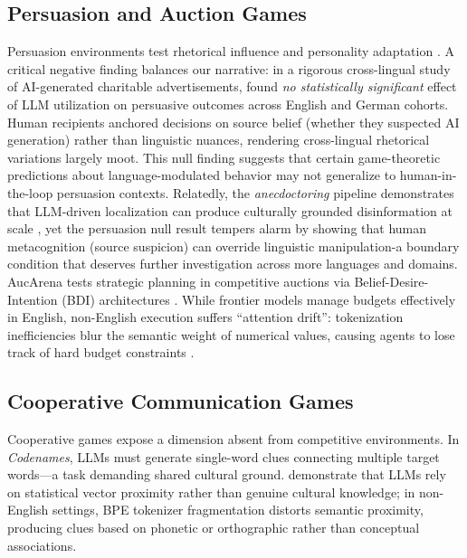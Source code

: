 \documentclass[11pt]{article}
\begin{document}
\subsection{Persuasion and Auction Games}
\label{sec:persuasion}

Persuasion environments test rhetorical influence and personality adaptation \citep{karande2024persuasion}. A critical negative finding balances our narrative: in a rigorous cross-lingual study of AI-generated charitable advertisements, \citet{arango2024persuasion} found \textit{no statistically significant} effect of LLM utilization on persuasive outcomes across English and German cohorts. Human recipients anchored decisions on source belief (whether they suspected AI generation) rather than linguistic nuances, rendering cross-lingual rhetorical variations largely moot. This null finding suggests that certain game-theoretic predictions about language-modulated behavior may not generalize to human-in-the-loop persuasion contexts. Relatedly, the \textit{anecdoctoring} pipeline demonstrates that LLM-driven localization can produce culturally grounded disinformation at scale \citep{lucas2025anecdoctoring}, yet the persuasion null result tempers alarm by showing that human metacognition (source suspicion) can override linguistic manipulation-a boundary condition that deserves further investigation across more languages and domains. AucArena tests strategic planning in competitive auctions via Belief-Desire-Intention (BDI) architectures \citep{chen2024aucarena}. While frontier models manage budgets effectively in English, non-English execution suffers ``attention drift'': tokenization inefficiencies blur the semantic weight of numerical values, causing agents to lose track of hard budget constraints \citep{chen2024aucarena}.

\subsection{Cooperative Communication Games}
\label{sec:cooperative}

Cooperative games expose a dimension absent from competitive environments. In \textit{Codenames}, LLMs must generate single-word clues connecting multiple target words---a task demanding shared cultural ground. \citet{hakimov2025codenames} demonstrate that LLMs rely on statistical vector proximity rather than genuine cultural knowledge; in non-English settings, BPE tokenizer fragmentation distorts semantic proximity, producing clues based on phonetic or orthographic rather than conceptual associations.
\end{document}
